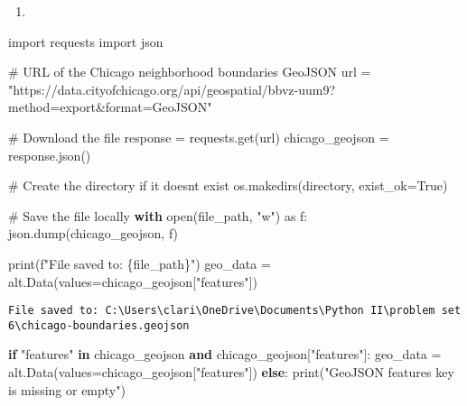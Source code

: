 \documentclass[
  letterpaper,
  DIV=11,
  numbers=noendperiod]{scrartcl}
\newenvironment{Shaded}{\begin{snugshade}}{\end{snugshade}}
\newcommand{\BuiltInTok}[1]{\textcolor[rgb]{0.00,0.23,0.31}{#1}}
\newcommand{\CommentTok}[1]{\textcolor[rgb]{0.37,0.37,0.37}{#1}}
\newcommand{\ControlFlowTok}[1]{\textcolor[rgb]{0.00,0.23,0.31}{\textbf{#1}}}
\newcommand{\ImportTok}[1]{\textcolor[rgb]{0.00,0.46,0.62}{#1}}
\newcommand{\KeywordTok}[1]{\textcolor[rgb]{0.00,0.23,0.31}{\textbf{#1}}}
\newcommand{\NormalTok}[1]{\textcolor[rgb]{0.00,0.23,0.31}{#1}}
\newcommand{\OperatorTok}[1]{\textcolor[rgb]{0.37,0.37,0.37}{#1}}
\newcommand{\SpecialCharTok}[1]{\textcolor[rgb]{0.37,0.37,0.37}{#1}}
\newcommand{\SpecialStringTok}[1]{\textcolor[rgb]{0.13,0.47,0.30}{#1}}
\newcommand{\StringTok}[1]{\textcolor[rgb]{0.13,0.47,0.30}{#1}}
\newcommand{\VariableTok}[1]{\textcolor[rgb]{0.07,0.07,0.07}{#1}}
\providecommand{\tightlist}{%
  \setlength{\itemsep}{0pt}\setlength{\parskip}{0pt}}\usepackage{longtable,booktabs,array}
\begin{document}
\begin{enumerate}
\def\labelenumi{\alph{enumi}.}
\setcounter{enumi}{1}
\tightlist
\item
\end{enumerate}

\begin{Shaded}
\begin{Highlighting}[]
\ImportTok{import}\NormalTok{ requests}
\ImportTok{import}\NormalTok{ json}
\end{Highlighting}
\end{Shaded}

\begin{Shaded}
\begin{Highlighting}[]
\CommentTok{\# URL of the Chicago neighborhood boundaries GeoJSON}
\NormalTok{url }\OperatorTok{=} \StringTok{"https://data.cityofchicago.org/api/geospatial/bbvz{-}uum9?method=export\&format=GeoJSON"}

\CommentTok{\# Download the file}
\NormalTok{response }\OperatorTok{=}\NormalTok{ requests.get(url)}
\NormalTok{chicago\_geojson }\OperatorTok{=}\NormalTok{ response.json()}

\CommentTok{\# Create the directory if it doesn\textquotesingle{}t exist}
\NormalTok{os.makedirs(directory, exist\_ok}\OperatorTok{=}\VariableTok{True}\NormalTok{)}

\CommentTok{\# Save the file locally}
\ControlFlowTok{with} \BuiltInTok{open}\NormalTok{(file\_path, }\StringTok{"w"}\NormalTok{) }\ImportTok{as}\NormalTok{ f:}
\NormalTok{    json.dump(chicago\_geojson, f)}

\BuiltInTok{print}\NormalTok{(}\SpecialStringTok{f"File saved to: }\SpecialCharTok{\{}\NormalTok{file\_path}\SpecialCharTok{\}}\SpecialStringTok{"}\NormalTok{)}
\NormalTok{geo\_data }\OperatorTok{=}\NormalTok{ alt.Data(values}\OperatorTok{=}\NormalTok{chicago\_geojson[}\StringTok{"features"}\NormalTok{])}
\end{Highlighting}
\end{Shaded}

\begin{verbatim}
File saved to: C:\Users\clari\OneDrive\Documents\Python II\problem set 6\chicago-boundaries.geojson
\end{verbatim}

\begin{Shaded}
\begin{Highlighting}[]
\ControlFlowTok{if} \StringTok{"features"} \KeywordTok{in}\NormalTok{ chicago\_geojson }\KeywordTok{and}\NormalTok{ chicago\_geojson[}\StringTok{"features"}\NormalTok{]:}
\NormalTok{    geo\_data }\OperatorTok{=}\NormalTok{ alt.Data(values}\OperatorTok{=}\NormalTok{chicago\_geojson[}\StringTok{"features"}\NormalTok{])}
\ControlFlowTok{else}\NormalTok{:}
    \BuiltInTok{print}\NormalTok{(}\StringTok{"GeoJSON \textquotesingle{}features\textquotesingle{} key is missing or empty"}\NormalTok{)}
\end{Highlighting}
\end{Shaded}
\end{document}
